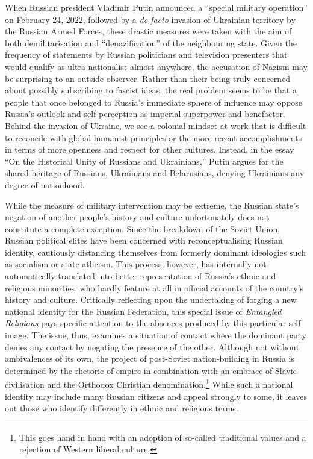 \documentclass[
  english,
  a4paper,
  DIV=12,
  footlines=2.1,
  usegeometry=true]{scrartcl}
\begin{document}
\leavevmode\marginpar{\textcolor{parnum}{{[}1{]}}}When Russian president
Vladimir Putin announced a ``special military operation'' on February
24, 2022, followed by a \emph{de facto} invasion of Ukrainian territory
by the Russian Armed Forces, these drastic measures were taken with the
aim of both demilitarisation and ``denazification'' of the neighbouring
state. Given the frequency of statements by Russian politicians and
television presenters that would qualify as ultra-nationalist almost
anywhere, the accusation of Nazism may be surprising to an outside
observer. Rather than their being truly concerned about possibly
subscribing to fascist ideas, the real problem seems to be that a people
that once belonged to Russia's immediate sphere of influence may oppose
Russia's outlook and self-perception as imperial superpower and
benefactor. Behind the invasion of Ukraine, we see a colonial mindset at
work that is difficult to reconcile with global humanist principles or
the more recent accomplishments in terms of more openness and respect
for other cultures. Instead, in the essay ``On the Historical Unity of
Russians and Ukrainians,'' Putin argues for the shared heritage of
Russians, Ukrainians and Belarusians, denying Ukrainians any degree of
nationhood.

\leavevmode\marginpar{\textcolor{parnum}{{[}2{]}}}While the measure of
military intervention may be extreme, the Russian state's negation of
another people's history and culture unfortunately does not constitute a
complete exception. Since the breakdown of the Soviet Union, Russian
political elites have been concerned with reconceptualising Russian
identity, cautiously distancing themselves from formerly dominant
ideologies such as socialism or state atheism. This process, however,
has internally not automatically translated into better representation
of Russia's ethnic and religious minorities, who hardly feature at all
in official accounts of the country's history and culture. Critically
reflecting upon the undertaking of forging a new national identity for
the Russian Federation, this special issue of \emph{Entangled Religions}
pays specific attention to the absences produced by this particular
self-image. The issue, thus, examines a situation of contact where the
dominant party denies any contact by negating the presence of the other.
Although not without ambivalences of its own, the project of post-Soviet
nation-building in Russia is determined by the rhetoric of empire in
combination with an embrace of Slavic civilisation and the Orthodox
Christian denomination.\footnote{This goes hand in hand with an adoption
  of so-called traditional values and a rejection of Western liberal
  culture.} While such a national identity may include many Russian
citizens and appeal strongly to some, it leaves out those who identify
differently in ethnic and religious terms.
\end{document}
